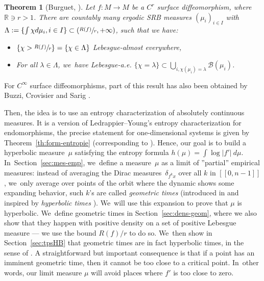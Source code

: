 \documentclass[11pt]{article}
\let\rC C
\newtheorem*{thm*}{Theorem}
\theoremstyle{definition}
\newcommand{\bbR}{{\mathbb{R}}}
\begin{document}
\begin{thm*}[Burguet, \cite{MR4701884}]
Let $f: M \to M$ be a $\rC^r$ surface diffeomorphism, where $\bbR \ni r > 1$.
There are countably many ergodic SRB measures $(\mu_i)_{i \in I}$ with $\Lambda := \{ \int \chi d \mu_i, i \in I \} \subset \left (\sfrac{R(f)}{r}, + \infty \right)$, such that we have:
\begin{itemize}
\item
$\left \{ \chi > \sfrac{R(f)}{r} \right \} = \{ \chi \in \Lambda \}$ Lebesgue-almost everywhere,
\item
For all $\lambda \in \Lambda$, we~have Lebesgue-a.e. $\{ \chi = \lambda \} \subset \bigcup_{i, \chi(\mu_i) = \lambda} \mathcal{B}(\mu_i)$.
\end{itemize}
\end{thm*}

For $\rC^{\infty}$ surface diffeomorphisms, part of this result has also been obtained by Buzzi, Crovisier and Sarig \cite{Buzzi_Crovisier_Sarig_2022}.

Then, the idea is to use an entropy characterization of absolutely continuous measures. It is a version of Ledrappier--Young's entropy characterization \cite{Ledrappier_Young_1985a,Ledrappier_Young_1985b} for endomorphisms, the precise statement for one-dimensional systems is given by Theorem~\ref{th:form-entropie} (corresponding to \cite[Th.\,VII.1.1]{SETE}).
Hence, our goal is to build a hyperbolic measure~$\mu$ satisfying the entropy formula $h(\mu) = \int \log |f'| \: d \mu$. In~Section~\ref{sec:mes-emp}, we~define a measure~$\mu$ as a limit of ''partial'' empirical measures: instead of averaging the Dirac measures~$\delta_{f^k x}$ over all $k$ in $[\![ 0, n-1 ]\!]$, we~only average over points of the orbit where the dynamic shows some expanding behavior, such $k$'s are called \textit{geometric times} (introduced in \cite{MR4701884} and inspired by \textit{hyperbolic times} \cite{Alves2000}). We~will use this expansion to prove that $\mu$ is hyperbolic. We~define geometric times in Section~\ref{sec:dens-geom}, where we also show that they happen with positive density on a set of positive Lebesgue measure --- we use the bound $R(f) / r$ to do so. We~then show in Section~\ref{sec:tpsHB} that geometric times are in fact hyperbolic times, in the sense of \cite{Alves2000}. A straightforward but important consequence is that if a point has an imminent geometric time, then it cannot be too close to a critical point. In~other words, our limit measure $\mu$ will avoid places where $f'$ is too close to zero.
\end{document}

